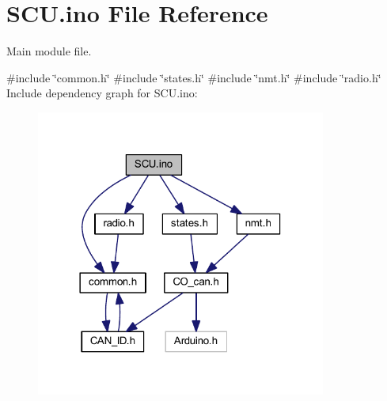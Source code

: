 \hypertarget{_s_c_u_8ino}{}\section{S\+C\+U.\+ino File Reference}
\label{_s_c_u_8ino}


Main module file.  


{\ttfamily \#include \char`\"{}common.\+h\char`\"{}}\newline
{\ttfamily \#include \char`\"{}states.\+h\char`\"{}}\newline
{\ttfamily \#include \char`\"{}nmt.\+h\char`\"{}}\newline
{\ttfamily \#include \char`\"{}radio.\+h\char`\"{}}\newline
Include dependency graph for S\+C\+U.\+ino\+:\nopagebreak
\begin{figure}[H]
\begin{center}
\leavevmode
\includegraphics[width=270pt]{_s_c_u_8ino__incl}
\end{center}
\end{figure}

